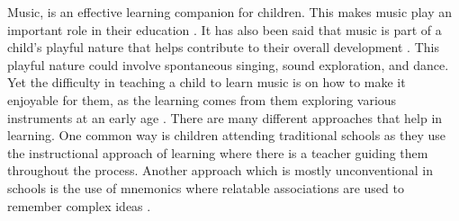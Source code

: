 Music, is an effective learning companion for children. This makes music play an important role in their education \cite{levinowitz1999importance}. It has also been said that music is part of a child’s playful nature that helps contribute to their overall development \cite{mcpherson2015child}. This playful nature could involve spontaneous singing, sound exploration, and dance. Yet the difficulty in teaching a child to learn music is on how to make it enjoyable for them, as the learning comes from them exploring various instruments at an early age \cite{ghazali2005minds}. There are many different approaches that help in learning. One common way is children attending traditional schools as they use the instructional approach of learning where there is a teacher guiding them throughout the process. Another approach which is mostly unconventional in schools is the use of mnemonics where relatable associations are used to remember complex ideas \cite{putnam2015mnemonics}. 

